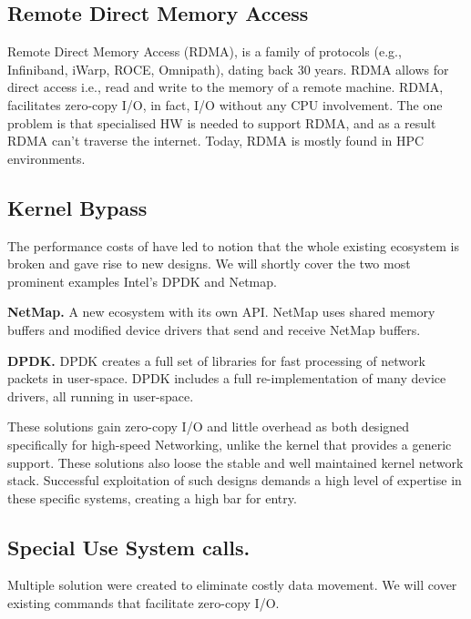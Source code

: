 \subsection{Remote Direct Memory Access}
Remote Direct Memory Access (RDMA), is a family of protocols (e.g., Infiniband\cite{infiniband}, iWarp\cite{iwarp}, ROCE\cite{roce}, Omnipath\cite{omnipath}), dating back 30 years. RDMA allows for direct access i.e., read and write to the memory of a remote machine. RDMA, facilitates zero-copy I/O, in fact, I/O without any CPU involvement. The one problem is that specialised HW is needed to support RDMA, and as a result RDMA can't traverse the internet. Today, RDMA is mostly found in HPC environments\cite{top500}.

\subsection{Kernel Bypass}
The performance costs of \sockets have led to notion that the whole existing ecosystem is broken and gave rise to new designs. We will shortly cover the two most prominent examples Intel's DPDK\cite{dpdk} and Netmap\cite{rizzo2012netmap}.


\noindent\textbf{NetMap.} A new ecosystem with its own API. NetMap uses shared memory buffers and modified device drivers that send and receive NetMap buffers. 

\noindent \textbf{DPDK.}
DPDK creates a full set of libraries for fast processing of network packets in user-space. DPDK includes a full re-implementation of many device drivers, all running in user-space.

\noindent These solutions gain zero-copy I/O and little overhead as both designed specifically for high-speed Networking, unlike the kernel that provides a generic support. These solutions also loose the stable and well maintained kernel network stack. Successful exploitation of such designs demands a high level of expertise in these specific systems, creating a high bar for entry.

\subsection{Special Use System calls.}
Multiple solution were created to eliminate costly data movement. We will cover existing commands that facilitate zero-copy I/O.

